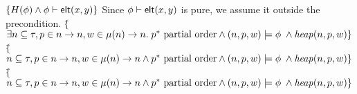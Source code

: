 \begin{specification}
\nextline $\{{H(\phi) \land {\phi} \vdash \mathsf{elt}({x}, {y})}\}$
\nextline Since ${\phi} \vdash \mathsf{elt}({x}, {y})$ is pure, we assume it outside
  the precondition. 
\nextline 
  $\{$\=$\exists n \subseteq \tau, p \in n \to n, w \in \mu(n) \to n.\;
      p^{*} \mbox{ partial order} \land 
             (n, p, w) \models \phi \;\land \mathit{heap}(n, p, w) \}$
\nextline 
  $\{$\=$n \subseteq \tau, p \in n \to n, w \in \mu(n) \to n \land
      p^{*} \mbox{ partial order} \land 
             (n, p, w) \models \phi \;\land \mathit{heap}(n, p, w) \}$
\nextline 
  $\{$\=$n \subseteq \tau, p \in n \to n, w \in \mu(n) \to n \land
      p^{*} \mbox{ partial order} \land 
             (n, p, w) \models \phi \;\land \mathit{heap}(n, p, w) \}$

\end{specification}
